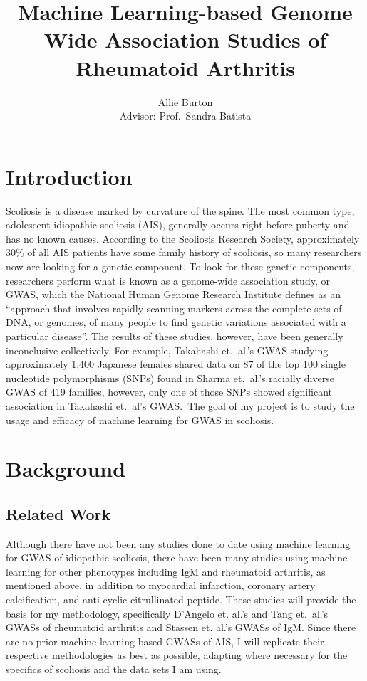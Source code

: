 \documentclass{article}
\begin{document}
\title{Machine Learning-based Genome Wide Association Studies of Rheumatoid Arthritis}

\author{Allie Burton\\Advisor: Prof.\ Sandra Batista}

\date{}
\maketitle

\doublespacing

\section*{Introduction}
Scoliosis is a disease marked by curvature of the spine. The most common type,
adolescent idiopathic scoliosis (AIS), generally occurs right before puberty and
has no known causes. According to the Scoliosis Research Society, approximately
30\% of all AIS patients have some family history of scoliosis, so many researchers
now are looking for a genetic component\cite{ScoliosisResearchSociety}. To look
for these genetic components, researchers perform what is known as a genome-wide
association study, or GWAS, which the National Human Genome Research Institute
defines as an ``approach that involves rapidly scanning markers across the
complete sets of DNA, or genomes, of many people to find genetic variations
associated with a particular disease''\cite{NationalHumanGenomeResearchInstitute2015}. 
The results of these studies, however, have been generally inconclusive collectively. 
For example, Takahashi et.\ al.'s\cite{Takahashi2011} GWAS studying approximately 
1,400 Japanese females shared data on 87 of the top 100 single nucleotide 
polymorphisms (SNPs) found in Sharma et.\ al.'s\cite{Sharma2011} racially diverse 
GWAS of 419 families, however, only one of those SNPs showed significant 
association in Takahashi et.\ al's GWAS.\ The goal of my project is to study the 
usage and efficacy of machine learning for GWAS in scoliosis.

\section*{Background}

\subsection*{Related Work}
Although there have not been any studies done to date using machine learning for
GWAS of idiopathic scoliosis, there have been many studies using machine learning
for other phenotypes including IgM and rheumatoid arthritis, as mentioned above,
in addition to myocardial infarction, coronary artery calcification, and anti-cyclic
citrullinated peptide\cite{Szymczak2016}. These studies will provide the basis
for my methodology, specifically D’Angelo et. al.’s\cite{DAngelo2009} and Tang
et.\ al.’s\cite{Tang2009} GWASs of rheumatoid arthritis and Stassen et. al.’s
GWASs of IgM. Since there are no prior machine learning-based GWASs of AIS, I
will replicate their respective methodologies as best as possible, adapting where
necessary for the specifics of scoliosis and the data sets I am using.
\end{document}
